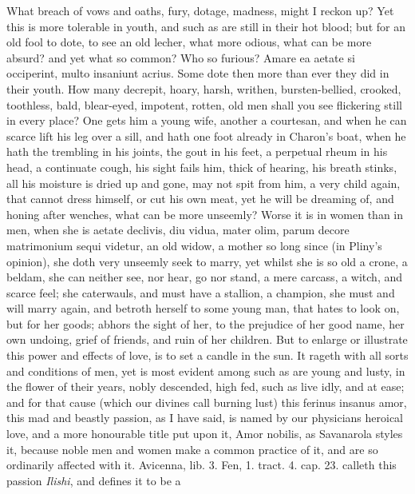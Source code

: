 {What breach of vows and oaths, fury, dotage, madness, might I reckon
up? Yet this is more tolerable in youth, and such as are still in their
hot blood; but for an old fool to dote, to see an old lecher, what more
odious, what can be more absurd? and yet what so common? Who so
furious? Amare ea aetate si occiperint, multo insaniunt acrius.
Some dote then more than ever they did in their youth. How many
decrepit, hoary, harsh, writhen, bursten-bellied, crooked, toothless,
bald, blear-eyed, impotent, rotten, old men shall you see flickering
still in every place? One gets him a young wife, another a courtesan,
and when he can scarce lift his leg over a sill, and hath one foot
already in Charon's boat, when he hath the trembling in his joints, the
gout in his feet, a perpetual rheum in his head, a continuate cough,
his sight fails him, thick of hearing, his breath stinks, all his
moisture is dried up and gone, may not spit from him, a very child
again, that cannot dress himself, or cut his own meat, yet he will be
dreaming of, and honing after wenches, what can be more unseemly? Worse
it is in women than in men, when she is aetate declivis, diu vidua,
mater olim, parum decore matrimonium sequi videtur, an old widow, a
mother so long since (in Pliny's opinion), she doth very unseemly
seek to marry, yet whilst she is so old a crone, a beldam, she
can neither see, nor hear, go nor stand, a mere carcass, a witch,
and scarce feel; she caterwauls, and must have a stallion, a champion,
she must and will marry again, and betroth herself to some young man,
that hates to look on, but for her goods; abhors the sight of
her, to the prejudice of her good name, her own undoing, grief of
friends, and ruin of her children.
But to enlarge or illustrate this power and effects of love, is to set
a candle in the sun. It rageth with all sorts and conditions of
men, yet is most evident among such as are young and lusty, in the
flower of their years, nobly descended, high fed, such as live idly,
and at ease; and for that cause (which our divines call burning lust)
this ferinus insanus amor, this mad and beastly passion, as I
have said, is named by our physicians heroical love, and a more
honourable title put upon it, Amor nobilis, as Savanarola styles
it, because noble men and women make a common practice of it, and are
so ordinarily affected with it. Avicenna, lib. 3. Fen, 1. tract. 4.
cap. 23. calleth this passion \emph{Ilishi}, and defines it to be a
}

